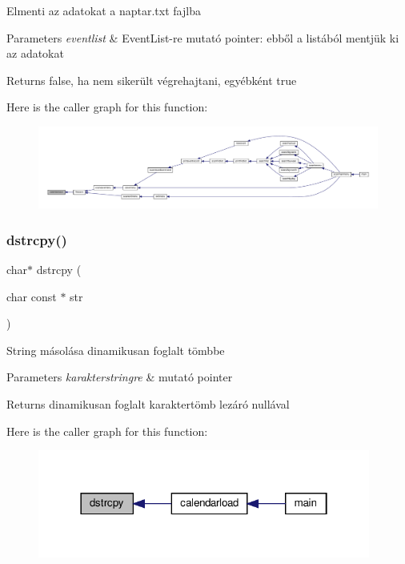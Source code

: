 Elmenti az adatokat a naptar.\+txt fajlba 
\begin{DoxyParams}{Parameters}
{\em eventlist} & Event\+List-\/re mutató pointer\+: ebből a listából mentjük ki az adatokat \\
\hline
\end{DoxyParams}
\begin{DoxyReturn}{Returns}
false, ha nem sikerült végrehajtani, egyébként true 
\end{DoxyReturn}
Here is the caller graph for this function\+:
\nopagebreak
\begin{figure}[H]
\begin{center}
\leavevmode
\includegraphics[width=350pt]{group__file_ga7f69872489b7c1c4bcdd125319a87b2e_icgraph}
\end{center}
\end{figure}
\mbox{\label{group__file_ga91b52505951ff88321e947b6e1c4b779}} 
\subsubsection{\texorpdfstring{dstrcpy()}{dstrcpy()}}
{\footnotesize\ttfamily char$\ast$ dstrcpy (\begin{DoxyParamCaption}\item[{char const $\ast$}]{str }\end{DoxyParamCaption})}

String másolása dinamikusan foglalt tömbbe 
\begin{DoxyParams}{Parameters}
{\em karakterstringre} & mutató pointer \\
\hline
\end{DoxyParams}
\begin{DoxyReturn}{Returns}
dinamikusan foglalt karaktertömb lezáró nullával 
\end{DoxyReturn}
Here is the caller graph for this function\+:
\nopagebreak
\begin{figure}[H]
\begin{center}
\leavevmode
\includegraphics[width=310pt]{group__file_ga91b52505951ff88321e947b6e1c4b779_icgraph}
\end{center}
\end{figure}
